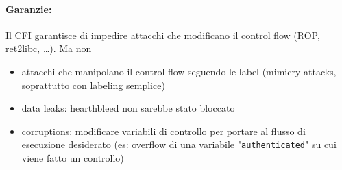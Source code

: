 \paragraph{Garanzie:} Il CFI garantisce di impedire attacchi che modificano il control flow (ROP, ret2libc, \dots). Ma non 
\begin{itemize}
	\item attacchi che manipolano il control flow seguendo le label (mimicry attacks, soprattutto con labeling semplice)
	\item data leaks: hearthbleed non sarebbe stato bloccato
	\item corruptions: modificare variabili di controllo per portare al flusso di esecuzione desiderato (es: overflow di una variabile "\texttt{authenticated}" su cui viene fatto un controllo)
\end{itemize}